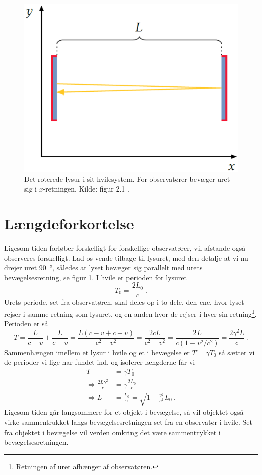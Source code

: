 \begin{figure}
    \centering
    \includegraphics[width = .6\columnwidth]{SR/billeder/lysur.eps}
    \caption{Det roterede lysur i sit hvilesystem. For observatører bevæger uret sig i $x$-retningen. Kilde: figur 2.1 \cite{uggerhojSpecielRelativitetsteori2016}.}
    \label{fig:roteret_lysur}
\end{figure}
%
\section{Længdeforkortelse} \label{sec:Laengdeforkortelse}
Ligesom tiden forløber forskelligt for forskellige observatører, vil afstande også observeres forskelligt.
Lad os vende tilbage til lysuret, med den detalje at vi nu drejer uret \SI{90}{\degree}, således at lyset bevæger sig parallelt med urets bevægelsesretning, se figur \ref{fig:roteret_lysur}. I hvile er perioden for lysuret
\begin{equation}
    T_0=\frac{2L_0}{c} \: .
\end{equation}
Urets periode, set fra observatøren, skal deles op i to dele, den ene, hvor lyset rejser i samme retning som lysuret, og en anden hvor de rejser i hver sin retning\footnote{Retningen af uret afhænger af observatøren.}.
Perioden er så
\begin{equation}
    T=\frac{L}{c+v}+\frac{L}{c-v}=\frac{L(c-v+c+v)}{c^2-v^2}=\frac{2cL}{c^2-v^2}=\frac{2L}{c(1-v^2/c^2)}=\frac{2\gamma^2 L}{c} \: .
\end{equation}
Sammenhængen imellem et lysur i hvile og et i bevægelse er $T=\gamma T_0$ så sætter vi de perioder vi lige har fundet ind, og isolerer længderne får vi
\begin{align}
T&=\gamma T_0\\
\Rightarrow \frac{2L\gamma^2}{c}&=\gamma\frac{2L_0}{c}\\
\Rightarrow L&=\frac{L_0}{\gamma}=\sqrt{1-\frac{v^2}{c^2}}L_0 \: . \label{rel:Laengdeforkortelse}
\end{align}
Ligesom tiden går langsommere for et objekt i bevægelse, så vil objektet også virke sammentrukket langs bevægelsesretningen set fra en observatør i hvile. Set fra objektet i bevægelse vil verden omkring det være sammentrykket i bevægelsesretningen.

